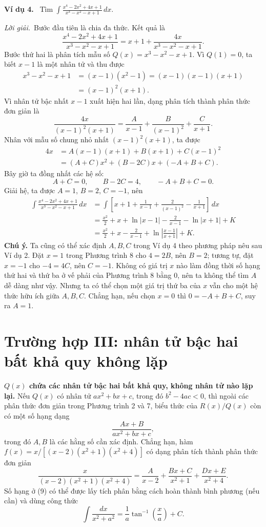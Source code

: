 \documentclass[12pt,a4paper]{article}
\newcommand{\ex}[1]{\par\medskip\noindent\textbf{Ví dụ #1.}\ }
\newcommand{\sol}{\par\nopagebreak[4]\noindent\textit{Lời giải.}\ }
\begin{document}
\ex{4} Tìm $\displaystyle\int\frac{x^4-2x^2+4x+1}{x^3-x^2-x+1}\,dx$.
\sol Bước đầu tiên là chia đa thức. Kết quả là
\[\frac{x^4-2x^2+4x+1}{x^3-x^2-x+1}=x+1+\frac{4x}{x^3-x^2-x+1}.\]
Bước thứ hai là phân tích mẫu số $Q(x)=x^3-x^2-x+1$. Vì $Q(1)=0$, ta biết $x-1$ là một nhân tử và thu được
\begin{align*}
x^3-x^2-x+1&=(x-1)(x^2-1)=(x-1)(x-1)(x+1)\\
&=(x-1)^2(x+1).
\end{align*}
Vì nhân tử bậc nhất $x-1$ xuất hiện hai lần, dạng phân tích thành phân thức đơn giản là
\[\frac{4x}{(x-1)^2(x+1)}=\frac A{x-1}+\frac B{(x-1)^2}+\frac C{x+1}.\]
Nhân với mẫu số chung nhỏ nhất $(x-1)^2(x+1)$, ta được
\begin{align*}
4x&=A(x-1)(x+1)+B(x+1)+C(x-1)^2\tag{8}\\
&=(A+C)x^2+(B-2C)x+(-A+B+C).
\end{align*}
Bây giờ ta đồng nhất các hệ số:
\[A+C=0,\qquad B-2C=4,\qquad -A+B+C=0.\]
Giải hệ, ta được $A=1$, $B=2$, $C=-1$, nên
\begin{align*}
\int\frac{x^4-2x^2+4x+1}{x^3-x^2-x+1}\,dx
&=\int\left[x+1+\frac1{x-1}+\frac2{(x-1)^2}-\frac1{x+1}\right]\,dx\\
&=\frac{x^2}{2}+x+\ln|x-1|-\frac2{x-1}-\ln|x+1|+K\\
&=\frac{x^2}{2}+x-\frac2{x-1}+\ln\left|\frac{x-1}{x+1}\right|+K.
\end{align*}
\textbf{Chú ý.} Ta cũng có thể xác định $A,B,C$ trong Ví dụ 4 theo phương pháp nêu sau Ví dụ 2. Đặt $x=1$ trong Phương trình 8 cho $4=2B$, nên $B=2$; tương tự, đặt $x=-1$ cho $-4=4C$, nên $C=-1$. Không có giá trị $x$ nào làm đồng thời số hạng thứ hai và thứ ba ở vế phải của Phương trình 8 bằng $0$, nên ta không thể tìm $A$ dễ dàng như vậy. Nhưng ta có thể chọn một giá trị thứ ba của $x$ vẫn cho một hệ thức hữu ích giữa $A,B,C$. Chẳng hạn, nếu chọn $x=0$ thì $0=-A+B+C$, suy ra $A=1$.

\section*{Trường hợp III: nhân tử bậc hai bất khả quy không lặp}
\textbf{$Q(x)$ chứa các nhân tử bậc hai bất khả quy, không nhân tử nào lặp lại.} Nếu $Q(x)$ có nhân tử $ax^2+bx+c$, trong đó $b^2-4ac<0$, thì ngoài các phân thức đơn giản trong Phương trình 2 và 7, biểu thức của $R(x)/Q(x)$ còn có một số hạng dạng
\begin{equation}\frac{Ax+B}{ax^2+bx+c},\tag{9}\end{equation}
trong đó $A,B$ là các hằng số cần xác định. Chẳng hạn, hàm $f(x)=x/[(x-2)(x^2+1)(x^2+4)]$ có dạng phân tích thành phân thức đơn giản
\[\frac{x}{(x-2)(x^2+1)(x^2+4)}=\frac A{x-2}+\frac{Bx+C}{x^2+1}+\frac{Dx+E}{x^2+4}.\]
Số hạng ở (9) có thể được lấy tích phân bằng cách hoàn thành bình phương (nếu cần) và dùng công thức
\begin{equation}\int\frac{dx}{x^2+a^2}=\frac1a\tan^{-1}\!\left(\frac xa\right)+C.\tag{10}\end{equation}
\end{document}
